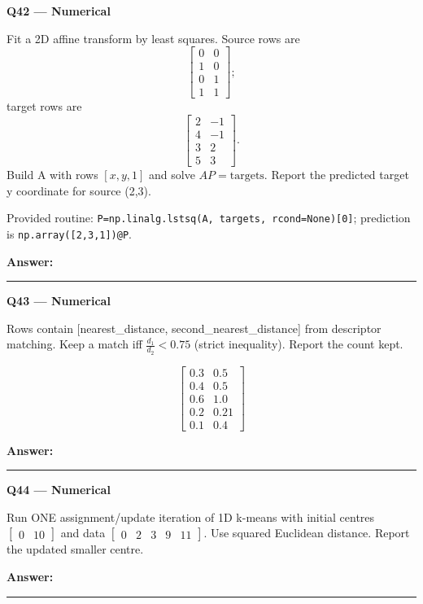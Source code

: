 \documentclass[11pt,a4paper]{article}
\begin{document}
\begin{minipage}{\linewidth}
\textbf{Q42 — Numerical}\par\smallskip
Fit a 2D affine transform by least squares. Source rows are
\[\begin{bmatrix}0&0\\1&0\\0&1\\1&1\end{bmatrix};\]
 target rows are
\[\begin{bmatrix}2&-1\\4&-1\\3&2\\5&3\end{bmatrix}.\]
 Build A with rows \([x,y,1]\) and solve \(AP=\text{targets}\). Report the predicted target y coordinate for source (2,\allowbreak{}3).

Provided routine: \texttt{P=\allowbreak{}np.linalg.lstsq(A,\allowbreak{} targets,\allowbreak{} rcond=\allowbreak{}None)[0]}; prediction is \texttt{np.array([2,\allowbreak{}3,\allowbreak{}1])@P}.
\par\medskip\textbf{Answer:} \rule{55mm}{0.4pt}
\end{minipage}
\par\vspace{12pt}
\begin{minipage}{\linewidth}
\textbf{Q43 — Numerical}\par\smallskip
Rows contain [nearest\_\allowbreak{}distance,\allowbreak{} second\_\allowbreak{}nearest\_\allowbreak{}distance] from descriptor matching. Keep a match iff \(\frac{d_1}{d_2}<0.75\) (strict inequality). Report the count kept.


\[
\begin{bmatrix}0.3&0.5\\0.4&0.5\\0.6&1.0\\0.2&0.21\\0.1&0.4\end{bmatrix}
\]

\par\medskip\textbf{Answer:} \rule{55mm}{0.4pt}
\end{minipage}
\par\vspace{12pt}
\begin{minipage}{\linewidth}
\textbf{Q44 — Numerical}\par\smallskip
Run ONE assignment/\allowbreak{}update iteration of 1D k-means with initial centres \(\begin{bmatrix}0&10\end{bmatrix}\) and data \(\begin{bmatrix}0&2&3&9&11\end{bmatrix}\). Use squared Euclidean distance. Report the updated smaller centre.
\par\medskip\textbf{Answer:} \rule{55mm}{0.4pt}
\end{minipage}
\end{document}
